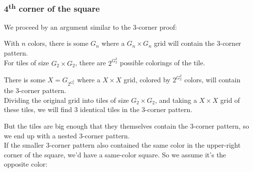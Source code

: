 \documentclass[11pt]{article}
\newcommand*{\scalePic}{0.4}
\newcommand{\echoWithinShell}[1]{ ( echo \\\\\\\\begin\\{lstlisting\\}\\[breaklines\\] && echo #1 && echo \\\\\\\\end\\{lstlisting\\} ) }
\newcommand{\shellRun}[2] {%
   && \echoWithinShell{\\ #1} && \echoWithinShell{\\ $OUTPUT} ) }%
}
\newcommand{\cppRun}[2]{%
  \shellRun{#1 #2}{run}
}
\begin{document}
\pagebreak
\subsubsection*{4\textsuperscript{th} corner of the square}

We proceed by an argument similar to the 3-corner proof:
\begin{center}
\end{center}

With $n$ colors, there is some $G_{n}$ where a $G_{n} \times G_{n}$ grid will contain the 3-corner pattern.\\
For tiles of size $G_{2} \times G_{2}$, there are $2^{G_{2}^2}$ possible colorings of the tile.

There is some $X=G_{2^{G_{2}^2}}$ where a $X \times X$ grid, colored by $2^{G_{2}^2}$ colors, will contain the 3-corner pattern.\\
Dividing the original grid into tiles of size $G_{2} \times G_{2}$, and taking a $X \times X$ grid of these tiles, we will find 3 identical tiles in the 3-corner pattern.

But the tiles are big enough that they themselves contain the 3-corner pattern, so we end up with a nested 3-corner pattern.\\
If the smaller 3-corner pattern also contained the same color in the upper-right corner of the square, we'd have a same-color square. So we assume it's the opposite color:
\begin{center}
\end{center}
\end{document}
